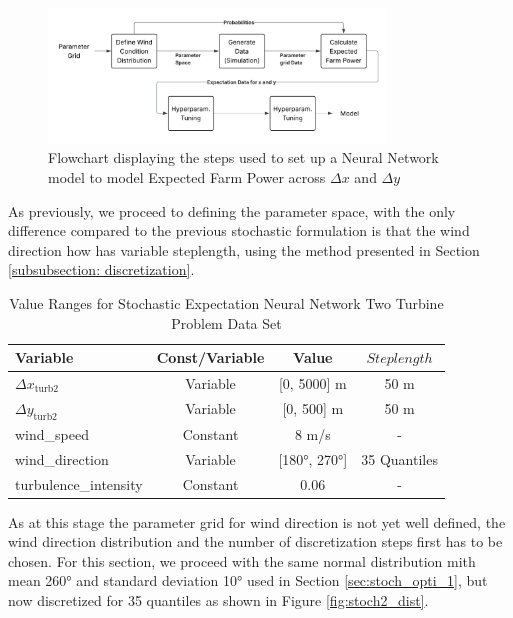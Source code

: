 \documentclass[preprint,12pt]{elsarticle}
\begin{document}
\begin{figure}[h] 
	\centering
	\includegraphics[width=0.8\textwidth]{../figures/optimization/stoch2/stoch2_model_flow.png} 
	\caption{Flowchart displaying the steps used to set up a Neural Network model to model Expected Farm Power across \(\Delta x\) and  \(\Delta y\)}
	\label{fig:stoch2_model_flow}
\end{figure} 

As previously, we proceed to defining the parameter space, with the only difference compared to the previous stochastic formulation is that the wind direction how has variable steplength, using the method presented in Section \ref{subsubsection: discretization}.

\begin{table}[ht]
	\centering
	\caption{Value Ranges for Stochastic Expectation Neural Network Two Turbine Problem Data Set}
	\begin{tabular}{|l|c|c|c|}
		\hline
		\textbf{Variable} & \textbf{Const/Variable} & \textbf{Value} & \textbf{$Steplength$}\\
		\hline
		$\Delta x_{\text{turb2}}$ & Variable & [0, 5000] m & 50 m\\
		$\Delta y_{\text{turb2}}$ & Variable & [0, 500] m  & 50 m\\
		wind\_speed & Constant & 8 m/s & -\\
		wind\_direction & Variable & [180°, 270°]& 35 Quantiles \\
		turbulence\_intensity & Constant & 0.06 & - \\
		\hline
	\end{tabular}
	\label{tab:val_prob2_data}
\end{table}

As at this stage the parameter grid for wind direction is not yet well defined, the wind direction distribution and the number of discretization steps first has to be chosen. For this section, we proceed with the same normal distribution mith mean 260° and standard deviation 10° used in Section \ref{sec:stoch_opti_1}, but now discretized for 35 quantiles as shown in Figure \ref{fig:stoch2_dist}.
\end{document}
